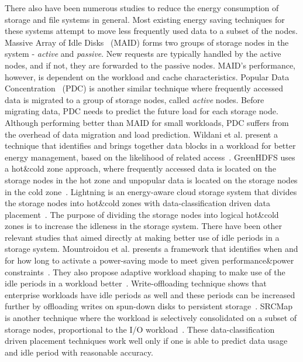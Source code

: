 \documentclass[preprint,12pt]{elsarticle}
\begin{document}
There also have been numerous studies to reduce the energy consumption of storage
and file systems in general. Most existing energy saving techniques for these systems
attempt to move less frequently used data to a subset of the nodes. Massive Array of Idle
Disks~\cite{Colarelli:2002:MAI:762761.762819} (MAID) forms two groups of storage nodes in the
system - \textit{active} and \textit{passive}. New requests are typically handled by the active
nodes, and if not, they are forwarded to the passive nodes. MAID's performance, however, is
dependent on the workload and cache characteristics.
Popular Data Concentration~\cite{Pinheiro:2004:ECT:1006209.1006220} (PDC) is another similar
technique where frequently accessed data is migrated to a group of storage nodes, called
\textit{active} nodes. Before migrating data, PDC needs to predict the future load for each storage
node. Although performing better than MAID for small workloads, PDC suffers from the overhead of
data migration and load prediction.
Wildani et al. present a technique that identifies and brings together data blocks in a workload
for better energy management, based on the likelihood of related access~\cite{Wildani:2011:EIW:1987816.1987823}.
GreenHDFS uses a hot\&cold zone approach, where frequently accessed data is located on the storage
nodes in the hot zone and unpopular data is located on the storage nodes in the cold
zone~\cite{Kaushik:2010:GTE:1924920.1924927}.
Lightning is an energy-aware cloud storage system that divides the storage nodes into hot\&cold zones
with data-classification driven data placement~\cite{Kaushik:2010:LSE:1851476.1851523}. The purpose of dividing
the storage nodes into logical hot\&cold zones is to increase the idleness in the storage system.
There have been other relevant studies that aimed directly at making better use of idle periods in a storage system.
Mountroidou et al. presents a framework that identifies when and for how long to activate a power-saving
mode to meet given performance\&power constraints~\cite{10.1109/IGCC.2011.6008570}. They also propose adaptive
workload shaping to make use of the idle periods in a workload better~\cite{Mountrouidou:2011:AWS:1958746.1958766}.
Write-offloading technique shows that enterprise workloads have idle periods as well and these periods
can be increased further by offloading writes on spun-down disks to persistent storage~\cite{Narayanan:2008:WOP:1416944.1416949}.
SRCMap is another technique where the workload is selectively consolidated on a subset of storage
nodes, proportional to the I/O workload~\cite{Verma:2010:SEP:1855511.1855531}. These data-classification driven
placement techniques work well only if one is able to predict data usage and idle period with reasonable
accuracy.
\end{document}
